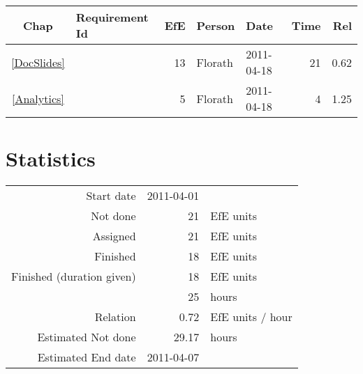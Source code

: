 {\small \begin{longtable}{|c|p{5.5cm}||r|l|l|r|r|} \hline
\textbf{Chap} & \textbf{Requirement Id} & \textbf{EfE} & \textbf{Person} & \textbf{Date} & \textbf{Time} & \textbf{Rel} \\ \hline\endhead
\ref{DocSlides} & \nameref{DocSlides} & 13 & Florath & 2011-04-18 & 21 & 0.62 \\ \hline
\ref{Analytics} & \nameref{Analytics} & 5 & Florath & 2011-04-18 & 4 & 1.25 \\ \hline
\end{longtable}}\section{Statistics}
\begin{longtable}{rrl}
Start date & 2011-04-01 & \\ 
Not done & 21 & EfE units \\ 
Assigned & 21 & EfE units \\ 
Finished & 18 & EfE units \\ 
Finished (duration given) & 18 & EfE units \\ 
 & 25 & hours \\ 
Relation & 0.72 & EfE units / hour \\ 
Estimated Not done & 29.17 & hours \\ 
Estimated End date & 2011-04-07 & \\ 
\end{longtable}